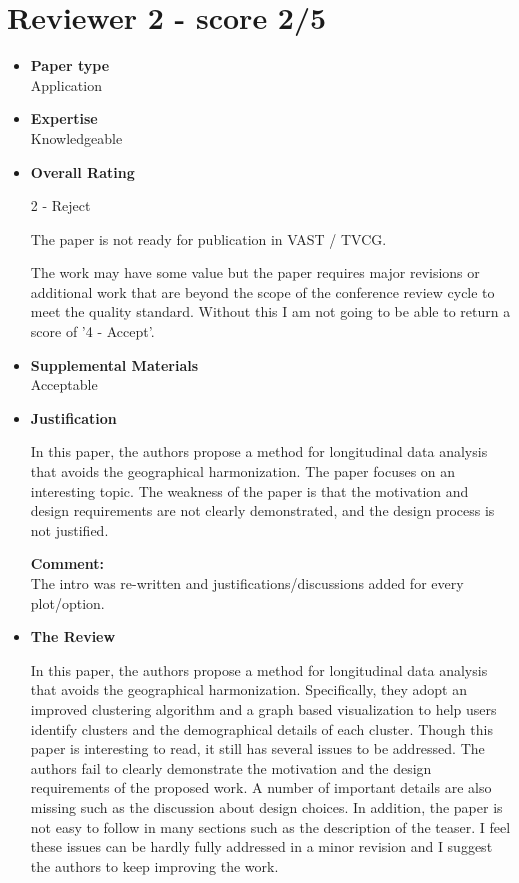 \documentclass{article}
\newcommand{\reply}[1]{\begin{tcolorbox}\noindent\textbf{Comment:}\\#1\hfill\end{tcolorbox}}
\begin{document}
\section{Reviewer 2 - score 2/5}
\begin{itemize}

\item{\textbf{Paper type}\\Application}

\item{\textbf{Expertise}\\Knowledgeable}

\item{\textbf{Overall Rating}

    2 - Reject
    
    The paper is not ready for publication in VAST / TVCG.
    
    The work may have some value but the paper requires major revisions or
    additional work that are beyond the scope of the conference review cycle to meet
    the quality standard. Without this I am not going to be able to return a score of
    '4 - Accept'.}

\item{\textbf{Supplemental Materials}\\Acceptable}

\item{\textbf{Justification}

    In this paper, the authors propose a method for longitudinal data analysis that
    avoids the geographical harmonization. The paper focuses on an interesting topic.
    The weakness of the paper is that the motivation and design requirements are not
    clearly demonstrated, and the design process is not justified.

    \reply{The intro was re-written and justifications/discussions added for every plot/option.}
    }

\item{\textbf{The Review}

    In this paper, the authors propose a method for longitudinal data analysis that
    avoids the geographical harmonization. Specifically, they adopt an improved
    clustering algorithm and a graph based visualization to help users identify
    clusters and the demographical details of each cluster. Though this paper is
    interesting to read, it still has several issues to be addressed. The authors fail
    to clearly demonstrate the motivation and the design requirements of the proposed
    work. A number of important details are also missing such as the discussion about
    design choices. In addition, the paper is not easy to follow in many sections such
    as the description of the teaser. I feel these issues can be hardly fully
    addressed in a minor revision and I suggest the authors to keep improving the
    work.

}
\end{itemize}
\end{document}
